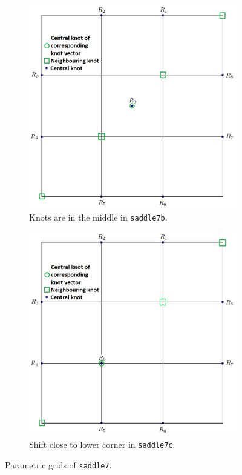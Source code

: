 \documentclass{article}
\begin{document}
\begin{figure}[H]
\begin{subfigure}[b]{0.32\textwidth}
\includegraphics[width=\textwidth]{saddle7bparam}
\caption{Knots are in the middle in \texttt{saddle7b}.}
\label{saddle7bp}
\end{subfigure}
\begin{subfigure}[b]{0.32\textwidth}
\includegraphics[width=\textwidth]{saddle7cparam}
\caption{Shift close to lower corner in \texttt{saddle7c}.}
\label{saddle7cp}
\end{subfigure}
\caption{Parametric grids of \texttt{saddle7}.}
\label{saddle7p}
\end{figure}
\end{document}
